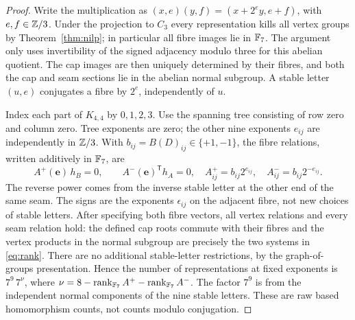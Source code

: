 \begin{proof}
Write the multiplication as
\((x,e)(y,f)=(x+2^e y,e+f)\), with \(e,f\in\mathbb Z/3\).
Under the projection to \(C_3\) every representation kills all
vertex groups by Theorem~\ref{thm:nilp}; in particular all fibre
images lie in \(\mathbb F_7\). The argument only uses invertibility of
the signed adjacency modulo three for this abelian quotient.
The cap images are then uniquely determined by their fibres,
and both the cap and seam sections lie in the abelian normal
subgroup. A stable letter \((u,e)\) conjugates a fibre by \(2^e\),
independently of \(u\).

Index each part of \(K_{4,4}\) by \(0,1,2,3\). Use the spanning
tree consisting of row zero and column zero. Tree exponents
are zero; the other nine exponents \(e_{ij}\) are independently
in \(\mathbb Z/3\). With \(b_{ij}=B(D)_{ij}\in\{+1,-1\}\), the fibre
relations, written additively in \(\mathbb F_7\), are
\begin{equation}\label{eq:rank}
  A^+(\mathbf e)\,h_B=0,\qquad
  A^-(\mathbf e)^{\mathsf T} h_A=0,\quad
  A^+_{ij}=b_{ij}2^{e_{ij}},\quad
  A^-_{ij}=b_{ij}2^{-e_{ij}} .
\end{equation}
The reverse power comes from the inverse stable letter at the
other end of the same seam. The signs are the exponents
\(\epsilon_{ij}\) on the adjacent fibre, not new choices of
stable letters. After specifying both fibre vectors, all vertex
relations and every seam relation hold: the defined cap roots
commute with their fibres and the vertex products in the normal
subgroup are precisely the two systems in \eqref{eq:rank}.
There are no additional stable-letter restrictions, by the
graph-of-groups presentation. Hence the number of representations
at fixed exponents is
\(7^9\,7^\nu\), where
\(\nu=8-\operatorname{rank}_{\mathbb F_7} A^+-\operatorname{rank}_{\mathbb F_7}A^-\).
The factor \(7^9\) is from the independent normal components
of the nine stable letters. These are raw based homomorphism
counts, not counts modulo conjugation.


\end{proof}
